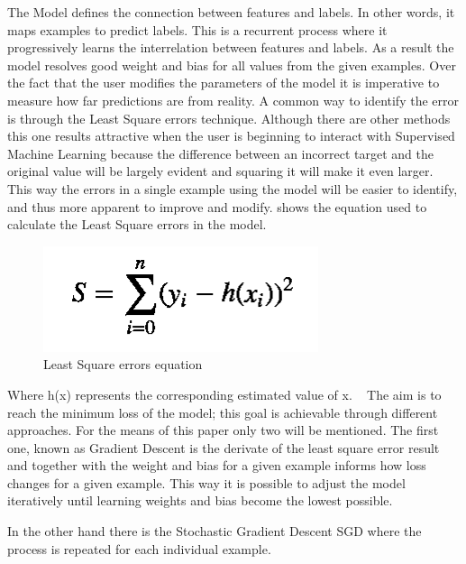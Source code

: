 The Model defines the connection between features and labels. In other words, it maps examples to predict labels. This is a recurrent process where it progressively learns the interrelation between features and labels. As a result the model resolves good weight and bias for all values from the given examples.  Over the fact that the user modifies the parameters of the model it is imperative to measure how far predictions are from reality.  A common way to identify the error is through the Least Square errors technique. Although there are other methods this one results attractive when the user is beginning to interact with Supervised Machine Learning because the difference between an incorrect target and the original value will be largely evident and squaring it will make it even larger. This way the errors in a single example using the model will be easier to identify, and thus more apparent to improve and modify. shows the equation used to calculate the Least Square errors in the model.


\begin{figure}[htbp]
  \centering
  \includegraphics[width=\textwidth]{images/equation1}
  \caption{ Least Square errors equation}
  \label{fig:L2loss equation}
\end{figure}


Where h(x) represents the corresponding estimated value of x. ~\cite{rish15} 
The aim is to reach the minimum loss of the model; this goal is achievable through different approaches. For the means of this paper only two will be mentioned. The first one, known as Gradient Descent is the derivate of the least square error result and together with the weight and bias for a given example informs how loss changes for a given example. This way it is possible to adjust the model iteratively until learning weights and bias become the lowest possible. 

In the other hand there is the Stochastic Gradient Descent \ac{SGD} where the process is repeated for each individual example.

